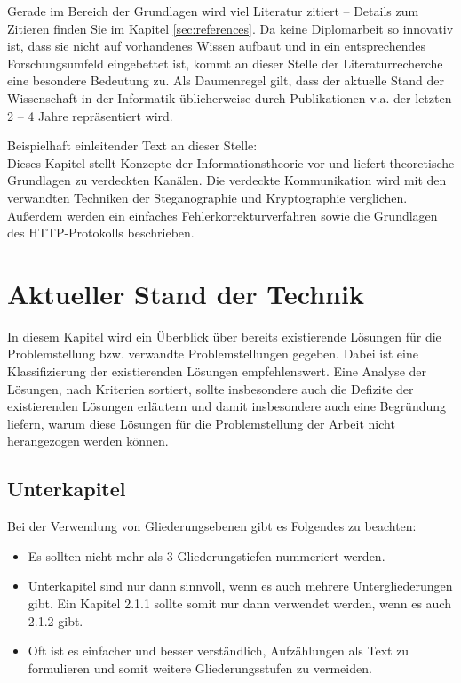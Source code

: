 Gerade im Bereich der Grundlagen wird viel Literatur zitiert -- Details zum Zitieren finden Sie im Kapitel \ref{sec:references}. Da keine Diplomarbeit so innovativ ist, dass sie nicht auf vorhandenes Wissen aufbaut und in ein entsprechendes Forschungsumfeld eingebettet ist, kommt an dieser Stelle der Literaturrecherche eine besondere Bedeutung zu. Als Daumenregel gilt, dass der aktuelle Stand der Wissenschaft in der Informatik üblicherweise durch Publikationen v.a. der letzten 2 – 4 Jahre repräsentiert wird.

\makeatletter\ifthesis@masterthesis
Beispielhaft einleitender Text an dieser Stelle:\\
Dieses Kapitel stellt Konzepte der Informationstheorie vor und liefert theoretische Grundlagen zu verdeckten Kanälen. Die verdeckte Kommunikation wird mit den verwandten Techniken der Steganographie und Kryptographie verglichen. Außerdem werden ein einfaches Fehlerkorrekturverfahren sowie die Grundlagen des HTTP-Protokolls beschrieben.
\fi\makeatother

\section{Aktueller Stand der Technik}

In diesem Kapitel wird ein Überblick über bereits existierende Lösungen für die Problemstellung bzw. verwandte Problemstellungen gegeben. Dabei ist eine Klassifizierung der existierenden Lösungen empfehlenswert. Eine Analyse der Lösungen, nach Kriterien sortiert, sollte insbesondere auch die Defizite der existierenden Lösungen erläutern und damit insbesondere auch eine Begründung liefern, warum diese Lösungen für die Problemstellung der Arbeit nicht herangezogen werden können.

\subsection{Unterkapitel}

Bei der Verwendung von Gliederungsebenen gibt es Folgendes zu beachten:
\begin{itemize}
	\item Es sollten nicht mehr als 3 Gliederungstiefen nummeriert werden.
	\item Unterkapitel sind nur dann sinnvoll, wenn es auch mehrere Untergliederungen gibt. Ein Kapitel 2.1.1 sollte somit nur dann verwendet werden, wenn es auch 2.1.2 gibt.
	\item Oft ist es einfacher und besser verständlich, Aufzählungen als Text zu formulieren und somit weitere Gliederungsstufen zu vermeiden.
\end{itemize}

